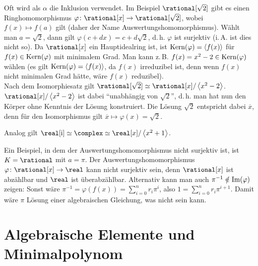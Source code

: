 \linie

\begin{Bsp}
    Oft wird als $\alpha$ die Inklusion verwendet.
    Im Beispiel $\rational[\sqrt{2}]$ gibt es einen Ringhomomorphismus
    $\varphi\colon \rational[x] \rightarrow \rational[\sqrt{2}]$, wobei
    $f(x) \mapsto f(a)$ gilt
    (daher der Name Auswertungshomomorphismus).
    Wählt man $a = \sqrt{2}$, dann gilt $\varphi(c + dx) = c + d\sqrt{2}$,
    d.\,h. $\varphi$ ist surjektiv (i.\,A. ist dies nicht so).
    Da $\rational[x]$ ein Hauptidealring ist, ist
    $\operatorname{Kern}(\varphi) = \left\langle f(x)\right\rangle$ für $f(x) \in \operatorname{Kern}(\varphi)$ mit
    minimalem Grad.
    Man kann z.\,B. $f(x) = x^2 - 2 \in \operatorname{Kern}(\varphi)$ wählen
    (es gilt $\operatorname{Kern}(\varphi) = \left\langle f(x)\right\rangle$, da $f(x)$ irreduzibel ist,
    denn wenn $f(x)$ nicht minimalen Grad hätte, wäre $f(x)$ reduzibel).\\
    Nach dem Isomorphiesatz gilt
    $\rational[\sqrt{2}] \simeq \rational[x]/\erzeugnis{x^2 - 2}$.
    $\rational[x]/\erzeugnis{x^2 - 2}$ ist dabei "`unabhängig von $\sqrt{2}$"',
    d.\,h. man hat nun den Körper ohne Kenntnis der Lösung konstruiert.
    Die Lösung $\sqrt{2}$ entspricht dabei $\overline{x}$,
    denn für den Isomorphismus gilt
    $\overline{x} \mapsto \varphi(x) = \sqrt{2}$.
\end{Bsp}

\begin{Bsp}
    Analog gilt $\real[\i] \simeq \complex \simeq
    \real[x]/\erzeugnis{x^2 + 1}$.
\end{Bsp}

\begin{Bsp}
    Ein Beispiel, in dem der Auswertungshomomorphismus nicht surjektiv ist,
    ist $K = \rational$ mit $a = \pi$.
    Der Auswertungshomomorphismus
    $\varphi\colon \rational[x] \rightarrow \real$ kann nicht surjektiv sein,
    denn $\rational[x]$ ist abzählbar und $\real$ ist überabzählbar.
    Alternativ kann man auch $\pi^{-1} \notin \operatorname{Im}(\varphi)$ zeigen:
    Sonst wäre $\pi^{-1} = \varphi(f(x)) = \sum_{i=0}^n r_i \pi^i$, also
    $1 = \sum_{i=0}^n r_i \pi^{i+1}$.
    Damit wäre $\pi$ Lösung einer algebraischen Gleichung, was nicht sein kann.
\end{Bsp}

\pagebreak

\section{%
    Algebraische Elemente und Minimalpolynom%
}

